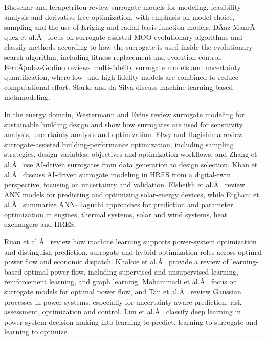Bhosekar and Ierapetritou \cite{Bhosekar2018} review surrogate models for modeling, feasibility
analysis and derivative-free optimization, with emphasis on model
choice, sampling and the use of Kriging and radial-basis-function
models. DÃ­az-ManrÃ­quez et al.Â~\cite{DiazManriquez2016} focus on surrogate-assisted MOO
evolutionary algorithms and classify methods according to how the
surrogate is used inside the evolutionary search algorithm, including
fitness replacement and evolution control. FernÃ¡ndez-Godino \cite{FernandezGodino2023} reviews
multi-fidelity surrogate models and uncertainty quantification, where
low- and high-fidelity models are combined to reduce computational
effort. Starke and da Silva \cite{Starke2025214} discuss
machine-learning-based metamodeling.

In the energy domain, Westermann and Evins \cite{Westermann2019} review surrogate modeling for
sustainable building design and show how surrogates are used for
sensitivity analysis, uncertainty analysis and optimization. Elwy and
Hagishima \cite{Elwy2024} review surrogate-assisted building-performance optimization, including
sampling strategies, design variables, objectives and optimization
workflows, and Zhang et al.Â~\cite{Zhang2026_building} use AI-driven surrogates from data
generation to design selection. Khan et al.Â~\cite{Khan2024_DT} discuss AI-driven
surrogate modeling in HRES from a digital-twin perspective, focusing on
uncertainty and validation. Elsheikh et al.Â~\cite{Elsheikh2019622} review ANN models for
predicting and optimizing solar-energy devices, while Etghani et
al.Â~\cite{Etghani2025}
summarize ANN--Taguchi approaches for prediction and parameter
optimization in engines, thermal systems, solar and wind systems, heat
exchangers and HRES.

Ruan et al.Â~\cite{Ruan2021221} review how machine learning supports power-system
optimization and distinguish prediction, surrogate and hybrid
optimization roles across optimal power flow and economic dispatch.
Khaloie et al.Â~\cite{Khaloie2025} provide a review of learning-based optimal power flow,
including supervised and unsupervised learning, reinforcement learning,
and graph learning. Mohammadi et al.Â~\cite{Mohammadi2024} focus on surrogate models for
optimal power flow, and Tan et al.Â~\cite{Tan2026} review Gaussian processes in power
systems, especially for uncertainty-aware prediction, risk assessment,
optimization and control. Lim et al.Â~\cite{Lim2025} classify deep learning in
power-system decision making into learning to predict, learning to
surrogate and learning to optimize.

